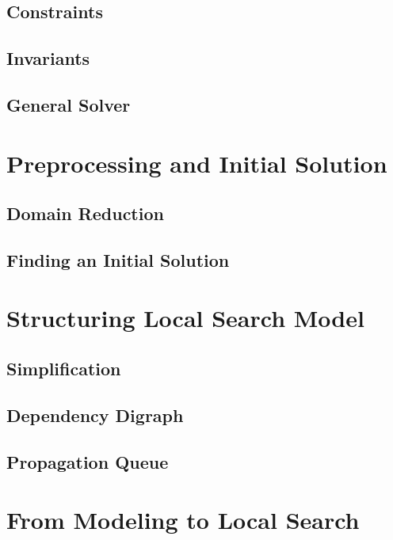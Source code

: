 \documentclass[a4paper,11pt]{article}
\begin{document}
  \subsection{Constraints}
   \label{sub_cons}
  \subsection{Invariants}
  \label{sub_inv}
  \subsection{General Solver}
  \label{sub_gen}
  
\newpage
\section{Preprocessing and Initial Solution} \label{sec_gecode}
  
  \subsection{Domain Reduction}
  
  \subsection{Finding an Initial Solution}
   \label{sub_inisol}

\newpage
\section{Structuring Local Search Model} \label{sec_ls}

  \subsection{Simplification}
  
  \subsection{Dependency Digraph}
     \label{sec_ddg}
  \subsection{Propagation Queue}  
    \label{sec_propaqueue}
    
  
\newpage  
\section{From Modeling to Local Search}

\end{document}
